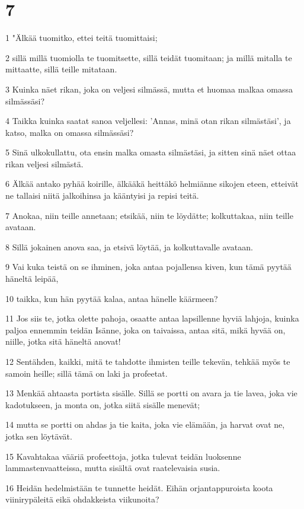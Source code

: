 \chapter{7}

\par 1 "Älkää tuomitko, ettei teitä tuomittaisi;
\par 2 sillä millä tuomiolla te tuomitsette, sillä teidät tuomitaan; ja millä mitalla te mittaatte, sillä teille mitataan.
\par 3 Kuinka näet rikan, joka on veljesi silmässä, mutta et huomaa malkaa omassa silmässäsi?
\par 4 Taikka kuinka saatat sanoa veljellesi: 'Annas, minä otan rikan silmästäsi', ja katso, malka on omassa silmässäsi?
\par 5 Sinä ulkokullattu, ota ensin malka omasta silmästäsi, ja sitten sinä näet ottaa rikan veljesi silmästä.
\par 6 Älkää antako pyhää koirille, älkääkä heittäkö helmiänne sikojen eteen, etteivät ne tallaisi niitä jalkoihinsa ja kääntyisi ja repisi teitä.
\par 7 Anokaa, niin teille annetaan; etsikää, niin te löydätte; kolkuttakaa, niin teille avataan.
\par 8 Sillä jokainen anova saa, ja etsivä löytää, ja kolkuttavalle avataan.
\par 9 Vai kuka teistä on se ihminen, joka antaa pojallensa kiven, kun tämä pyytää häneltä leipää,
\par 10 taikka, kun hän pyytää kalaa, antaa hänelle käärmeen?
\par 11 Jos siis te, jotka olette pahoja, osaatte antaa lapsillenne hyviä lahjoja, kuinka paljoa ennemmin teidän Isänne, joka on taivaissa, antaa sitä, mikä hyvää on, niille, jotka sitä häneltä anovat!
\par 12 Sentähden, kaikki, mitä te tahdotte ihmisten teille tekevän, tehkää myös te samoin heille; sillä tämä on laki ja profeetat.
\par 13 Menkää ahtaasta portista sisälle. Sillä se portti on avara ja tie lavea, joka vie kadotukseen, ja monta on, jotka siitä sisälle menevät;
\par 14 mutta se portti on ahdas ja tie kaita, joka vie elämään, ja harvat ovat ne, jotka sen löytävät.
\par 15 Kavahtakaa vääriä profeettoja, jotka tulevat teidän luoksenne lammastenvaatteissa, mutta sisältä ovat raatelevaisia susia.
\par 16 Heidän hedelmistään te tunnette heidät. Eihän orjantappuroista koota viinirypäleitä eikä ohdakkeista viikunoita?
